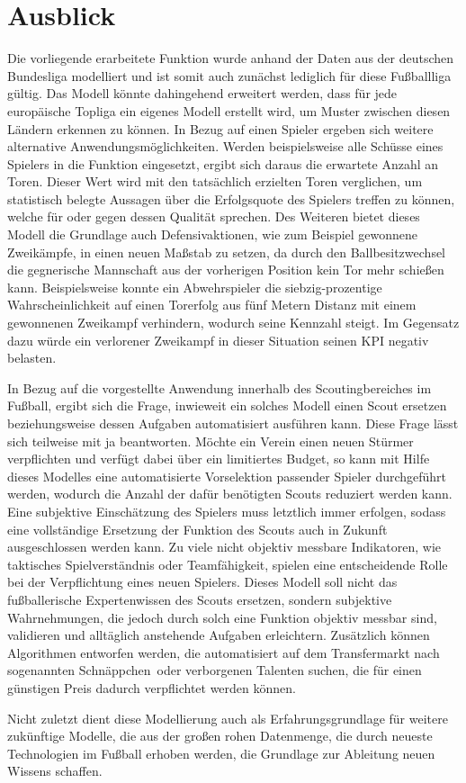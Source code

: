 \section{Ausblick}
\label{ausblick}

Die vorliegende erarbeitete Funktion wurde anhand der Daten aus der deutschen Bundesliga modelliert und ist somit auch zunächst lediglich für diese Fußballliga gültig. Das Modell könnte dahingehend erweitert werden, dass für jede europäische Topliga ein eigenes Modell erstellt wird, um Muster zwischen diesen Ländern erkennen zu können. In Bezug auf einen Spieler ergeben sich weitere alternative Anwendungsmöglichkeiten. Werden beispielsweise alle Schüsse eines Spielers in die Funktion eingesetzt, ergibt sich daraus die erwartete Anzahl an Toren. Dieser Wert wird mit den tatsächlich erzielten Toren verglichen, um statistisch belegte Aussagen über die Erfolgsquote des Spielers treffen zu können, welche für oder gegen dessen Qualität sprechen. Des Weiteren bietet dieses Modell die Grundlage auch Defensivaktionen, wie zum Beispiel gewonnene Zweikämpfe, in einen neuen Maßstab zu setzen, da durch den Ballbesitzwechsel die gegnerische Mannschaft aus der vorherigen Position kein Tor mehr schießen kann. Beispielsweise konnte ein Abwehrspieler die siebzig-prozentige Wahrscheinlichkeit auf einen Torerfolg aus fünf Metern Distanz mit einem gewonnenen Zweikampf verhindern, wodurch seine Kennzahl steigt. Im Gegensatz dazu würde ein verlorener Zweikampf in dieser Situation seinen KPI negativ belasten.

In Bezug auf die vorgestellte Anwendung innerhalb des Scoutingbereiches im Fußball, ergibt sich die Frage, inwieweit ein solches Modell einen Scout ersetzen beziehungsweise dessen Aufgaben automatisiert ausführen kann. Diese Frage lässt sich teilweise mit ja beantworten. Möchte ein Verein einen neuen Stürmer verpflichten und verfügt dabei über ein limitiertes Budget, so kann mit Hilfe dieses Modelles eine automatisierte Vorselektion passender Spieler durchgeführt werden, wodurch die Anzahl der dafür benötigten Scouts reduziert werden kann. Eine subjektive Einschätzung des Spielers muss letztlich immer erfolgen, sodass eine vollständige Ersetzung der Funktion des Scouts auch in Zukunft ausgeschlossen werden kann. Zu viele nicht objektiv messbare Indikatoren, wie taktisches Spielverständnis oder Teamfähigkeit, spielen eine entscheidende Rolle bei der Verpflichtung eines neuen Spielers. Dieses Modell soll nicht das fußballerische Expertenwissen des Scouts ersetzen, sondern subjektive Wahrnehmungen, die jedoch durch solch eine Funktion objektiv messbar sind, validieren und alltäglich anstehende Aufgaben erleichtern. Zusätzlich können Algorithmen entworfen werden, die automatisiert auf dem Transfermarkt nach sogenannten \glqq Schnäppchen\grqq~oder verborgenen Talenten suchen, die für einen günstigen Preis dadurch verpflichtet werden können. 

Nicht zuletzt dient diese Modellierung auch als Erfahrungsgrundlage für weitere zukünftige Modelle, die aus der großen rohen Datenmenge, die durch neueste Technologien im Fußball erhoben werden, die Grundlage zur Ableitung neuen Wissens schaffen.
